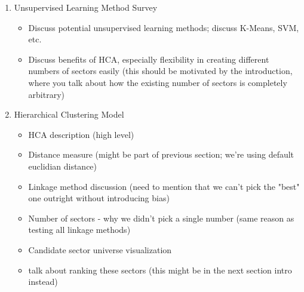 \documentclass[../main.tex]{subfiles}
\begin{document}
\begin{enumerate}
    \item Unsupervised Learning Method Survey
    \begin{itemize}
        \item Discuss potential unsupervised learning methods; discuss K-Means, SVM, etc.
        \item Discuss benefits of HCA, especially flexibility in creating different numbers of sectors easily (this should be motivated by the introduction, where you talk about how the existing number of sectors is completely arbitrary)
    \end{itemize}
    
    \item Hierarchical Clustering Model

    \begin{itemize}
        \item HCA description (high level)
        \item Distance measure (might be part of previous section; we're using default euclidian distance)
        \item Linkage method discussion (need to mention that we can't pick the "best" one outright without introducing bias)
        \item Number of sectors - why we didn't pick a single number (same reason as testing all linkage methods)
        \item Candidate sector universe visualization
        \item talk about ranking these sectors (this might be in the next section intro instead)
    \end{itemize}


\end{enumerate}
\end{document}
